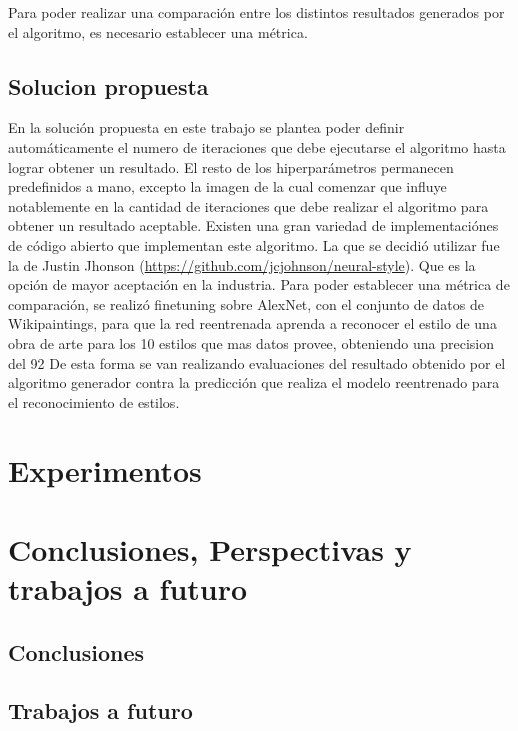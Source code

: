 \documentclass[a4paper,12pt,spanish]{book}
\begin{document}
    Para poder realizar una comparación entre los distintos resultados generados por el algoritmo, es necesario establecer una métrica.
  \section{Solucion propuesta}
    En la solución propuesta en este trabajo se plantea poder definir automáticamente el numero de iteraciones que debe ejecutarse el algoritmo hasta lograr obtener un resultado.
    El resto de los hiperparámetros permanecen predefinidos a mano, excepto la imagen de la cual comenzar que influye notablemente en la cantidad de iteraciones que debe realizar el 
    algoritmo para obtener un resultado aceptable.
    Existen una gran variedad de implementaciónes de código abierto que implementan este algoritmo. La que se decidió utilizar fue la de Justin Jhonson (\url{https://github.com/jcjohnson/neural-style}).
    Que es la opción de mayor aceptación en la industria.
    Para poder establecer una métrica de comparación, se realizó finetuning sobre AlexNet, con el conjunto de datos de Wikipaintings, para que la red reentrenada aprenda a reconocer
    el estilo de una obra de arte para los 10 estilos que mas datos provee, obteniendo una precision del 92%
    De esta forma se van realizando evaluaciones del resultado obtenido por el algoritmo generador contra la predicción que realiza el modelo reentrenado para el reconocimiento de estilos.
    
  \printindex
\chapter{Experimentos}
\chapter{Conclusiones, Perspectivas y trabajos a futuro}
  \section{Conclusiones}
  \section{Trabajos a futuro}
\end{document}
